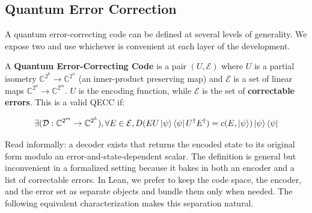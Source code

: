 \subsection{Quantum Error Correction}\label{sec:qec}

%
%

A quantum error-correcting code can be defined at several levels of generality.
We expose two and use whichever is convenient at each layer of the development.

\begin{definition}
    A \textbf{Quantum Error-Correcting Code} is a pair $(U, \mathcal{E})$ where
    $U$ is a partial isometry $\mathbb{C}^{2^k} \rightarrow \mathbb{C}^{2^n}$
    (an inner-product preserving map) and $\mathcal{E}$ is a set of linear maps
    $\mathbb{C}^{2^n} \rightarrow \mathbb{C}^{2^m}$. $U$ is the encoding
    function, while $\mathcal{E}$ is the set of \textbf{correctable errors}.
    This is a valid QECC if:

    $$\exists (\mathcal{D} : \mathbb{C}^{2^m} \rightarrow \mathbb{C}^{2^k}),
    \forall E \in \mathcal{E}, D(EU\ket{\psi}\bra{\psi}U^\dagger E^\dagger) =
    c(E, \ket{\psi})\ket{\psi}\bra{\psi}$$
\end{definition}

%
%

Read informally: a decoder exists that returns the encoded state to its original
form modulo an error-and-state-dependent scalar. The definition is general but
inconvenient in a formalized setting because it bakes in both an encoder and a
list of correctable errors. In Lean, we prefer to keep the code space, the
encoder, and the error set as separate objects and bundle them only when needed.
The following equivalent characterization makes this separation natural.

